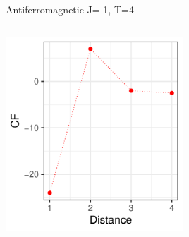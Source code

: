 \documentclass{beamer}
\begin{document}
\begin{frame}{Antiferromagnetic J=-1, T=4}
\begin{columns}
\begin{column}{0.5\textwidth}
\begin{center}
     \end{center}
         \begin{center}
     \includegraphics[width=0.5\textwidth]{Pic/J-1_60_2500_T=4_CORRELATION.pdf}
     \end{center}
\end{column}
\end{columns}
\end{frame}
\end{document}
